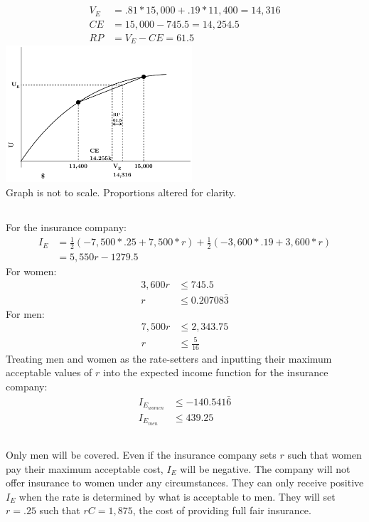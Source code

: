 \documentclass{article}
\begin{document}
	\subsection[c]{}
		\begin{align*}
			V_E &= .81*15,000 + .19*11,400 = 14,316 \\
			CE &= 15,000	 - 745.5 = 14,254.5 \\
			RP &= V_E - CE = 61.5
		\end{align*}
		\includegraphics[height=2in]{Charts/2c}
		 \\Graph is not to scale. Proportions altered for clarity. 
	\subsection[d]{}
		For the insurance company:
		\begin{align*}
			I_E &= \frac{1}{2} (-7,500*.25+7,500*r)+\frac{1}{2}(-3,600*.19+3,600*r) \\
			&= 5,550r - 1279.5
		\end{align*}
		For women: 
		\begin{align*}
			3,600r & \leq 745.5 \\
			r &\leq 0.20708\bar{3}
		\end{align*}
		For men: 
		\begin{align*}
			7,500r &  \leq 2,343.75 \\
			r &\leq \frac{5}{16}
		\end{align*}
		Treating men and women as the rate-setters and inputting their maximum acceptable values of $r$ into the expected income function for the insurance company:
		\begin{align*}
			I_{E_{women}} &\leq -140.541\bar{6} \\
			I_{E_{men}} &\leq 439.25
		\end{align*}
	\subsection[e]{}	
		Only men will be covered. Even if the insurance company sets $r$ such that women pay their maximum acceptable cost, $I_E$ will be negative. The company will not offer insurance to women under any circumstances. They can only receive positive $I_E$ when the rate is determined by what is acceptable to men. They will set $r=.25$ such that $rC=1,875$, the cost of providing full fair insurance. 
		
\end{document}
